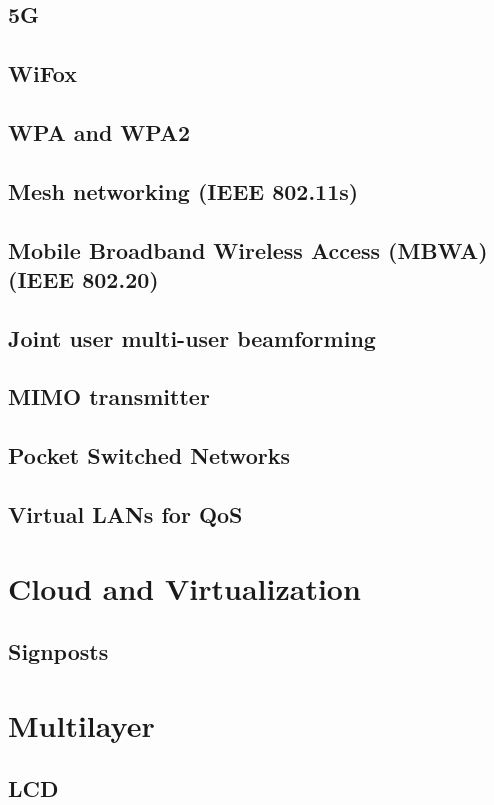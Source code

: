 \documentclass[journal]{IEEEtran}
\begin{document}
\subsection{ 5G }
\subsection{ WiFox }
\subsection{ WPA and WPA2 }
\subsection{ Mesh networking (IEEE 802.11s) }
\subsection{ Mobile Broadband Wireless Access (MBWA) (IEEE 802.20)}
\subsection{ Joint user multi-user beamforming }
\subsection{ MIMO transmitter }
\subsection{ Pocket Switched Networks }
\subsection{ Virtual LANs for QoS }


\section{Cloud and Virtualization}
\subsection{ Signposts }

\section{Multilayer}
\subsection{ LCD }
\end{document}
